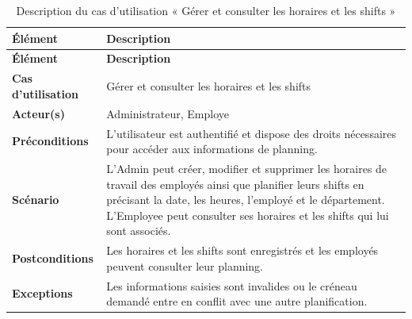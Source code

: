 \begin{longtable}{|>{\RaggedRight\arraybackslash}p{4cm}|>{\RaggedRight\arraybackslash}p{10.5cm}|}
\caption{Description du cas d'utilisation « Gérer et consulter les horaires et les shifts »}
\label{tab:uc2-horaires-shifts}\\

\hline

\textbf{Élément} & \textbf{Description} \\

\hline

\endfirsthead

\hline

\textbf{Élément} & \textbf{Description} \\

\hline

\endhead

\textbf{Cas d'utilisation} &
Gérer et consulter les horaires et les shifts \\

\hline

\textbf{Acteur(s)} &
Administrateur, Employe \\

\hline

\textbf{Préconditions} &
L'utilisateur est authentifié et dispose des droits nécessaires pour accéder aux informations de planning. \\

\hline

\textbf{Scénario} &
L'Admin peut créer, modifier et supprimer les horaires de travail des employés ainsi que planifier leurs shifts en précisant la date, les heures, l'employé et le département. L'Employee peut consulter ses horaires et les shifts qui lui sont associés. \\

\hline

\textbf{Postconditions} &
Les horaires et les shifts sont enregistrés et les employés peuvent consulter leur planning. \\

\hline

\textbf{Exceptions} &
Les informations saisies sont invalides ou le créneau demandé entre en conflit avec une autre planification. \\

\hline


\end{longtable}



